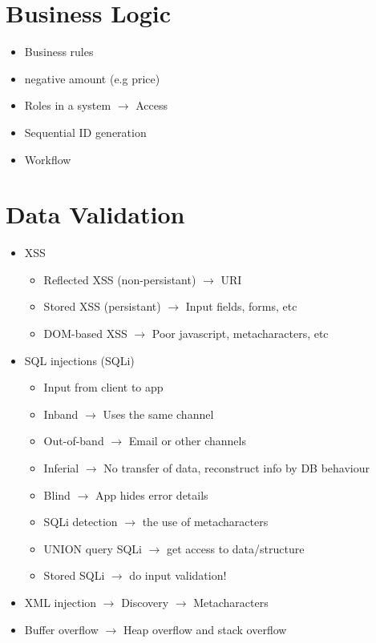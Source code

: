 \section{Business Logic}
	\begin{itemize}
		\item Business rules
		\item negative amount (e.g price)
		\item Roles in a system $\rightarrow$ Access 
		\item Sequential ID generation
		\item Workflow
	\end{itemize}

\section{Data Validation}

	\begin{itemize}
		\item XSS
			\begin{itemize}
				\item Reflected XSS (non-persistant) $\rightarrow$ URI
				\item Stored XSS (persistant) $\rightarrow$ Input fields, forms, etc
				\item DOM-based XSS $\rightarrow$ Poor javascript, metacharacters, etc
			\end{itemize}
		\item SQL injections (SQLi)
			\begin{itemize}
				\item Input from client to app
				\item Inband $\rightarrow$ Uses the same channel
				\item Out-of-band $\rightarrow$ Email or other channels
				\item Inferial $\rightarrow$ No transfer of data, reconstruct info by DB behaviour
				\item Blind $\rightarrow$ App hides error details
				\item SQLi detection $\rightarrow$ the use of metacharacters
				\item UNION query SQLi $\rightarrow$ get access to data/structure
				\item Stored SQLi $\rightarrow$ do input validation!
			\end{itemize}
		\item XML injection $\rightarrow$ Discovery $\rightarrow$ Metacharacters
		\item Buffer overflow $\rightarrow$ Heap overflow and stack overflow
	\end{itemize}

